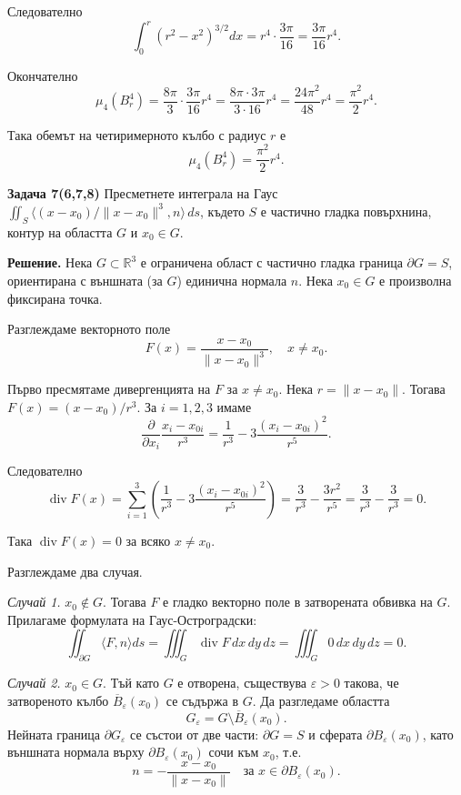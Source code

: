 \documentclass[10pt]{article}
\begin{document}
Следователно
\[
\int_0^r (r^2 - x^2)^{3/2} dx = r^4 \cdot \frac{3\pi}{16} = \frac{3\pi}{16} r^4.
\]

Окончателно
\[
\mu_4(B_r^4) = \frac{8\pi}{3} \cdot \frac{3\pi}{16} r^4 = \frac{8\pi \cdot 3\pi}{3 \cdot 16} r^4 = \frac{24\pi^2}{48} r^4 = \frac{\pi^2}{2} r^4.
\]

Така обемът на четиримерното кълбо с радиус $r$ е
\[
\boxed{\mu_4(B_r^4) = \frac{\pi^2}{2} r^4}.
\]

\textbf{Задача 7(6,7,8) }Пресметнете интеграла на Гаус $\iint_S \langle (x-x_0)/\|x-x_0\|^3, n\rangle \,ds$, където $S$ е частично гладка повърхнина, контур на областта $G$ и $x_0 \in G$. 

\textbf{Решение.} 
Нека $G \subset \mathbb{R}^3$ е ограничена област с частично гладка граница $\partial G = S$, ориентирана с външната (за $G$) единична нормала $n$. Нека $x_0 \in G$ е произволна фиксирана точка.

Разглеждаме векторното поле
\[
F(x) = \frac{x - x_0}{\|x - x_0\|^3}, \quad x \neq x_0.
\]

Първо пресмятаме дивергенцията на $F$ за $x \neq x_0$. Нека $r = \|x - x_0\|$. Тогава $F(x) = (x - x_0)/r^3$. За $i = 1,2,3$ имаме
\[
\frac{\partial}{\partial x_i} \frac{x_i - x_{0i}}{r^3} = \frac{1}{r^3} - 3\frac{(x_i - x_{0i})^2}{r^5}.
\]

Следователно
\[
\operatorname{div} F(x) = \sum_{i=1}^3 \left( \frac{1}{r^3} - 3\frac{(x_i - x_{0i})^2}{r^5} \right) = \frac{3}{r^3} - \frac{3r^2}{r^5} = \frac{3}{r^3} - \frac{3}{r^3} = 0.
\]

Така $\operatorname{div} F(x) = 0$ за всяко $x \neq x_0$.

Разглеждаме два случая.

\textit{Случай 1.} $x_0 \notin G$. Тогава $F$ е гладко векторно поле в затворената обвивка на $G$. Прилагаме формулата на Гаус-Остроградски:
\[
\iint_{\partial G} \langle F, n \rangle ds = \iiint_G \operatorname{div} F \,dx\,dy\,dz = \iiint_G 0 \,dx\,dy\,dz = 0.
\]

\textit{Случай 2.} $x_0 \in G$. Тъй като $G$ е отворена, съществува $\varepsilon > 0$ такова, че затвореното кълбо $\overline{B}_\varepsilon(x_0)$ се съдържа в $G$. Да разгледаме областта
\[
G_\varepsilon = G \setminus \overline{B}_\varepsilon(x_0).
\]
Нейната граница $\partial G_\varepsilon$ се състои от две части: $\partial G = S$ и сферата $\partial B_\varepsilon(x_0)$, като външната нормала върху $\partial B_\varepsilon(x_0)$ сочи към $x_0$, т.е.
\[
n = -\frac{x - x_0}{\|x - x_0\|} \quad \text{за } x \in \partial B_\varepsilon(x_0).
\]
\end{document}
